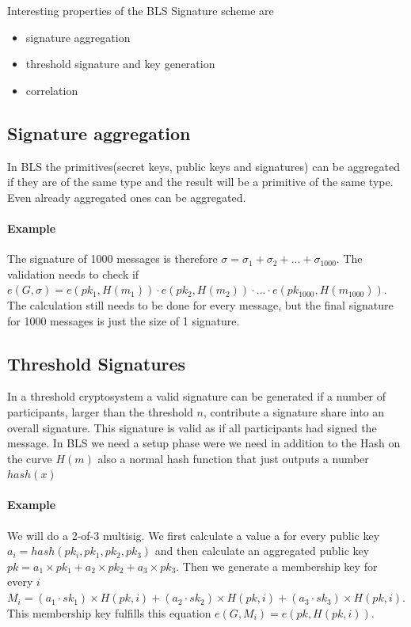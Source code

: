 \documentclass[a4paper,12pt]{scrartcl}
\begin{document}

Interesting properties of the BLS Signature scheme are
\begin{itemize}
	\item signature aggregation
	\item threshold signature and key generation
	\item correlation
\end{itemize}

\subsection{Signature aggregation}

In BLS the primitives(secret keys, public keys and signatures) can be aggregated if they are of the same type and the result will be a primitive of the same type. Even already aggregated ones can be aggregated.

\paragraph{Example}

The signature of 1000 messages is therefore $\sigma = \sigma_1 + \sigma_2 + ... + \sigma_{1000}$. The validation needs to check if $e(G,\sigma) = e(pk_1,H(m_1)) \cdot e(pk_2,H(m_2)) \cdot ... \cdot e(pk_{1000},H(m_{1000}))$. The calculation still needs to be done for every message, but the final signature for 1000 messages is just the size of 1 signature.

\subsection{Threshold Signatures}

In a threshold cryptosystem a valid signature can be generated if a number of participants, larger than the threshold $n$, contribute a signature share into an overall signature. This signature is valid as if all participants had signed the message. In BLS we need a setup phase were we need in addition to the Hash on the curve $H(m)$ also a normal hash function that just outputs a number $hash(x)$

\paragraph{Example}

We will do a 2-of-3 multisig.
We first calculate a value a for every public key $a_i = hash(pk_i,{pk_1,pk_2,pk_3})$ and then calculate an aggregated public key $pk = a_1\times{pk_1}+a_2\times{pk_2}+a_3\times{pk_3}$. Then we generate a membership key for every $i$ $M_i = (a_1 \cdot sk_1) \times{H(pk,i)} + (a_2 \cdot sk_2) \times{H(pk,i)} + (a_3 \cdot sk_3) \times{H(pk,i)}$. This membership key fulfills this equation $e(G,M_i) = e(pk,H(pk,i))$.
\end{document}
